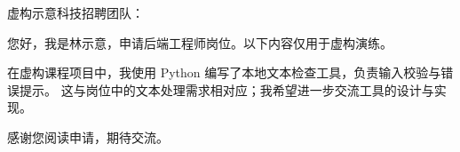 \documentclass[a4paper,fontset=none,zihao=5]{ctexart}
\begin{document}

虚构示意科技招聘团队：

您好，我是林示意，申请后端工程师岗位。以下内容仅用于虚构演练。

在虚构课程项目中，我使用 Python 编写了本地文本检查工具，负责输入校验与错误提示。
这与岗位中的文本处理需求相对应；我希望进一步交流工具的设计与实现。

感谢您阅读申请，期待交流。

\end{document}
